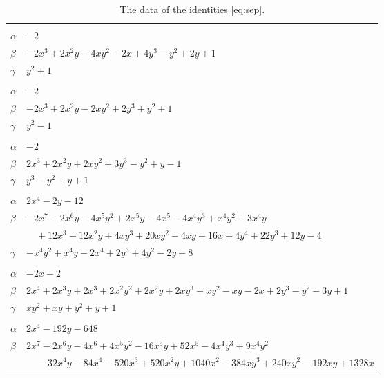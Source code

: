 \documentclass[11pt]{article}
\begin{document}
\begingroup\footnotesize
\setlength{\LTcapwidth}{\textwidth}
\begin{longtable}{@{}ll@{}}
\caption{The data of the identities \eqref{eq:sep}.}\label{tab:sep}\\
\hline\endfirsthead\hline\endhead\hline\endfoot
\multicolumn{2}{@{}l}{$\{i,j\}=\{0,3\}$, $k_{ij}=2$}\\
$\alpha$ & $-2$\\
$\beta$ & $-2x^{3}+2x^{2}y-4xy^{2}-2x+4y^{3}-y^{2}+2y+1$\\
$\gamma$ & $y^{2}+1$\\
\addlinespace[3pt]
\multicolumn{2}{@{}l}{$\{i,j\}=\{0,4\}$, $k_{ij}=2$}\\
$\alpha$ & $-2$\\
$\beta$ & $-2x^{3}+2x^{2}y-2xy^{2}+2y^{3}+y^{2}+1$\\
$\gamma$ & $y^{2}-1$\\
\addlinespace[3pt]
\multicolumn{2}{@{}l}{$\{i,j\}=\{1,2\}$, $k_{ij}=2\cdot 3$}\\
$\alpha$ & $-2$\\
$\beta$ & $2x^{3}+2x^{2}y+2xy^{2}+3y^{3}-y^{2}+y-1$\\
$\gamma$ & $y^{3}-y^{2}+y+1$\\
\addlinespace[3pt]
\multicolumn{2}{@{}l}{$\{i,j\}=\{1,3\}$, $k_{ij}=2^{3}$}\\
$\alpha$ & $2x^{4}-2y-12$\\
$\beta$ & $-2x^{7}-2x^{6}y-4x^{5}y^{2}+2x^{5}y-4x^{5}-4x^{4}y^{3}+x^{4}y^{2}-3x^{4}y$\\
 & $\quad +12x^{3}+12x^{2}y+4xy^{3}+20xy^{2}-4xy+16x+4y^{4}+22y^{3}+12y-4$\\
$\gamma$ & $-x^{4}y^{2}+x^{4}y-2x^{4}+2y^{3}+4y^{2}-2y+8$\\
\addlinespace[3pt]
\multicolumn{2}{@{}l}{$\{i,j\}=\{1,4\}$, $k_{ij}=2\cdot 3$}\\
$\alpha$ & $-2x-2$\\
$\beta$ & $2x^{4}+2x^{3}y+2x^{3}+2x^{2}y^{2}+2x^{2}y+2xy^{3}+xy^{2}-xy-2x+2y^{3}-y^{2}-3y+1$\\
$\gamma$ & $xy^{2}+xy+y^{2}+y+1$\\
\addlinespace[3pt]
\multicolumn{2}{@{}l}{$\{i,j\}=\{2,3\}$, $k_{ij}=2^{12}$}\\
$\alpha$ & $2x^{4}-192y-648$\\
$\beta$ & $2x^{7}-2x^{6}y-4x^{6}+4x^{5}y^{2}-16x^{5}y+52x^{5}-4x^{4}y^{3}+9x^{4}y^{2}$\\
 & $\quad -32x^{4}y-84x^{4}-520x^{3}+520x^{2}y+1040x^{2}-384xy^{3}+240xy^{2}-192xy+1328x$\\

\end{longtable}
\end{document}
